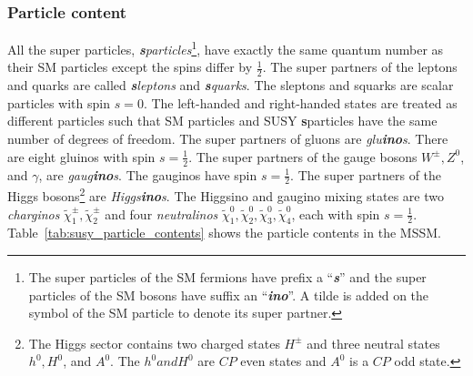 \subsubsection{Particle content}
\label{subsubsec:susy_particle_content}
All the super particles, \textit{\textbf{s}particles}\footnote{The super particles of the SM fermions have prefix a ``\textit{\textbf{s}}'' and the super particles of the SM bosons have suffix an ``\textit{\textbf{ino}}''. A tilde is added on the symbol of the SM particle to denote its super partner.}, have exactly the same quantum number as their SM particles except the spins differ by $\frac{1}{2}$.
The super partners of the leptons and quarks are called \textit{\textbf{s}leptons} and \textit{\textbf{s}quarks}.
The sleptons and squarks are scalar particles with spin $s=0$.
The left-handed and right-handed states are treated as different particles such that SM particles and SUSY \textbf{s}particles have the same number of degrees of freedom.
The super partners of gluons are \textit{glu\textbf{ino}s}.
There are eight gluinos with spin $s=\frac{1}{2}$. 
The super partners of the gauge bosons $W^{\pm}, Z^{0}$, and $\gamma$, are \textit{gaug\textbf{ino}s}.
The gauginos have spin $s = \frac{1}{2}$.
The super partners of the Higgs bosons\footnote{The Higgs sector contains two charged states $H^{\pm}$ and three neutral states $h^{0}, H^{0}$, and $A^{0}$. The $h^{0} and H^{0}$ are $CP$ even states and $A^{0}$ is a $CP$ odd state.} are \textit{Higgs\textbf{ino}s}.
The Higgsino and gaugino mixing states are two \textit{charginos} $\tilde{\chi}_{1}^{\pm}, \tilde{\chi}_{2}^{\pm}$ and four \textit{neutralinos} $\tilde{\chi}_{1}^{0}, \tilde{\chi}_{2}^{0}, \tilde{\chi}_{3}^{0}, \tilde{\chi}_{4}^{0}$, each with spin $s=\frac{1}{2}$.
Table~\ref{tab:susy_particle_contents} shows the particle contents in the MSSM.

